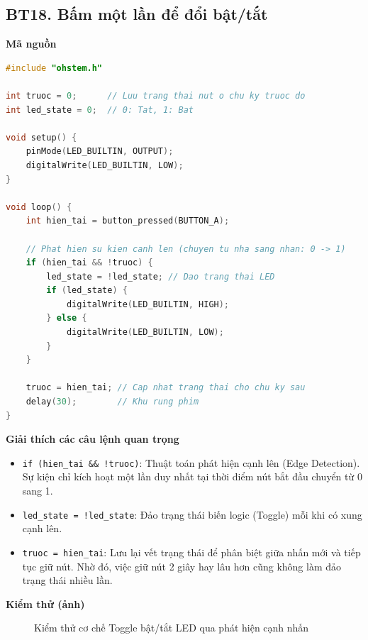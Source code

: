 \subsection*{BT18. Bấm một lần để đổi bật/tắt}

\noindent\textbf{Mã nguồn}\\
\begin{lstlisting}[language=C]
#include "ohstem.h"

int truoc = 0;      // Luu trang thai nut o chu ky truoc do
int led_state = 0;  // 0: Tat, 1: Bat

void setup() {
    pinMode(LED_BUILTIN, OUTPUT);
    digitalWrite(LED_BUILTIN, LOW);
}

void loop() {
    int hien_tai = button_pressed(BUTTON_A);

    // Phat hien su kien canh len (chuyen tu nha sang nhan: 0 -> 1)
    if (hien_tai && !truoc) {
        led_state = !led_state; // Dao trang thai LED
        if (led_state) {
            digitalWrite(LED_BUILTIN, HIGH);
        } else {
            digitalWrite(LED_BUILTIN, LOW);
        }
    }

    truoc = hien_tai; // Cap nhat trang thai cho chu ky sau
    delay(30);        // Khu rung phim
}
\end{lstlisting}

\noindent\textbf{Giải thích các câu lệnh quan trọng}\\
\begin{itemize}
    \item \texttt{if (hien\_tai \&\& !truoc)}: Thuật toán phát hiện cạnh lên (Edge Detection). Sự kiện chỉ kích hoạt một lần duy nhất tại thời điểm nút bắt đầu chuyển từ 0 sang 1.
    \item \texttt{led\_state = !led\_state}: Đảo trạng thái biến logic (Toggle) mỗi khi có xung cạnh lên.
    \item \texttt{truoc = hien\_tai}: Lưu lại vết trạng thái để phân biệt giữa nhấn mới và tiếp tục giữ nút. Nhờ đó, việc giữ nút 2 giây hay lâu hơn cũng không làm đảo trạng thái nhiều lần.
\end{itemize}

\noindent\textbf{Kiểm thử (ảnh)}\\
\begin{figure}[H]
    \centering
    \caption{Kiểm thử cơ chế Toggle bật/tắt LED qua phát hiện cạnh nhấn}
    \label{fig:bt18}
\end{figure}

